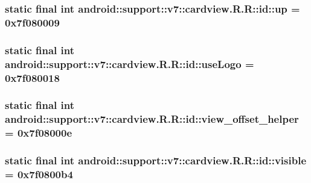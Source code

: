 \hypertarget{classandroid_1_1support_1_1v7_1_1cardview_1_1_r_1_1id_917f6a1b444c525fa043e7ec9e165f1e}{
\subsubsection[{up}]{\setlength{\rightskip}{0pt plus 5cm}static final int android::support::v7::cardview.R.R::id::up = 0x7f080009}}
\label{classandroid_1_1support_1_1v7_1_1cardview_1_1_r_1_1id_917f6a1b444c525fa043e7ec9e165f1e}


\hypertarget{classandroid_1_1support_1_1v7_1_1cardview_1_1_r_1_1id_e59096b6186e3c2f80fc0976494e7a1f}{
\subsubsection[{useLogo}]{\setlength{\rightskip}{0pt plus 5cm}static final int android::support::v7::cardview.R.R::id::useLogo = 0x7f080018}}
\label{classandroid_1_1support_1_1v7_1_1cardview_1_1_r_1_1id_e59096b6186e3c2f80fc0976494e7a1f}


\hypertarget{classandroid_1_1support_1_1v7_1_1cardview_1_1_r_1_1id_38cafd90d760542298119b5eae35b4fc}{
\subsubsection[{view\_\-offset\_\-helper}]{\setlength{\rightskip}{0pt plus 5cm}static final int android::support::v7::cardview.R.R::id::view\_\-offset\_\-helper = 0x7f08000e}}
\label{classandroid_1_1support_1_1v7_1_1cardview_1_1_r_1_1id_38cafd90d760542298119b5eae35b4fc}


\hypertarget{classandroid_1_1support_1_1v7_1_1cardview_1_1_r_1_1id_36c2eba910bdc4678e38b93263820e48}{
\subsubsection[{visible}]{\setlength{\rightskip}{0pt plus 5cm}static final int android::support::v7::cardview.R.R::id::visible = 0x7f0800b4}}
\label{classandroid_1_1support_1_1v7_1_1cardview_1_1_r_1_1id_36c2eba910bdc4678e38b93263820e48}


